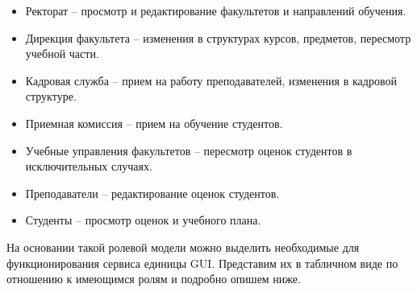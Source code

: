 \documentclass[12pt,a4paperб]{article}
\begin{document}
	\begin{itemize}
		\item Ректорат -- просмотр и редактирование факультетов и направлений обучения.
		\item Дирекция факультета -- изменения в структурах курсов, предметов, пересмотр учебной части.
		\item Кадровая служба -- прием на работу преподавателей, изменения в кадровой структуре.
		\item Приемная комиссия -- прием на обучение студентов.
		\item Учебные управления факультетов -- пересмотр оценок студентов в исключительных случаях.
		\item Преподаватели -- редактирование оценок студентов.
		\item Студенты -- просмотр оценок и учебного плана.
	\end{itemize}
	
	На основании такой ролевой модели можно выделить необходимые для функционирования сервиса единицы GUI.  	 Представим их в табличном виде по отношению к имеющимся ролям и подробно опишем ниже.
	 
\end{document}
